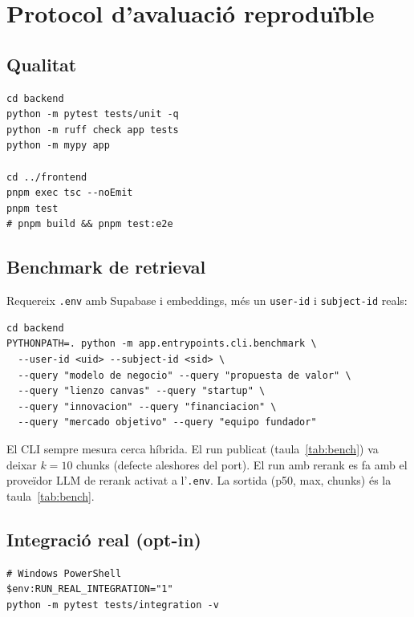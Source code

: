\chapter{Protocol d'avaluació reproduïble}
\label{anexo:eval}

\section{Qualitat}

\begin{lstlisting}
cd backend
python -m pytest tests/unit -q
python -m ruff check app tests
python -m mypy app

cd ../frontend
pnpm exec tsc --noEmit
pnpm test
# pnpm build && pnpm test:e2e
\end{lstlisting}

\section{Benchmark de retrieval}

Requereix \texttt{.env} amb Supabase i embeddings, més un \texttt{user-id} i \texttt{subject-id} reals:

\begin{lstlisting}
cd backend
PYTHONPATH=. python -m app.entrypoints.cli.benchmark \
  --user-id <uid> --subject-id <sid> \
  --query "modelo de negocio" --query "propuesta de valor" \
  --query "lienzo canvas" --query "startup" \
  --query "innovacion" --query "financiacion" \
  --query "mercado objetivo" --query "equipo fundador"
\end{lstlisting}

El CLI sempre mesura cerca híbrida. El run publicat (taula~\ref{tab:bench}) va deixar $k=10$ chunks (defecte aleshores del port). El run amb rerank es fa amb el proveïdor LLM de rerank activat a l'\texttt{.env}. La sortida (p50, max, chunks) és la taula~\ref{tab:bench}.

\section{Integració real (opt-in)}

\begin{lstlisting}
# Windows PowerShell
$env:RUN_REAL_INTEGRATION="1"
python -m pytest tests/integration -v
\end{lstlisting}
